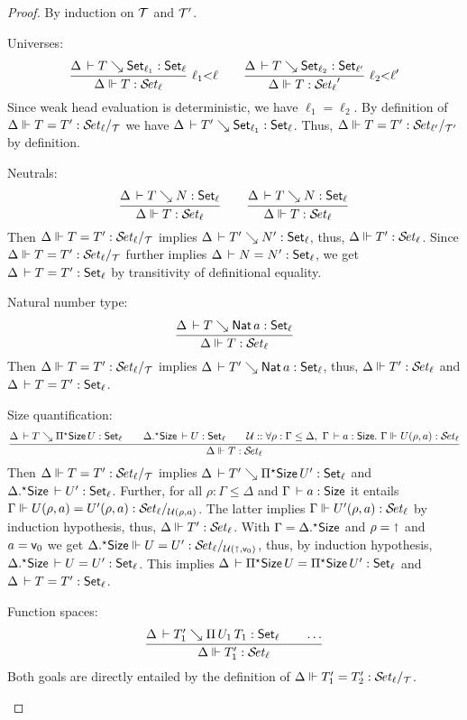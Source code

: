 \documentclass[acmlarge,review,anonymous]{acmart}\settopmatter{printfolios=true}
\begin{document}
\begin{proof}
  By induction on $\T$ and $\T'$.  %
\begin{caselist}

\nextcase Universes:
\[
  \rux{\Delta \der T \evalsto \Set[\ell_1] : \Set[\ell]
     }{\sty \Delta T \ell
     }{\ell_1 {<} \ell}
\qquad
  \rux{\Delta \der T \evalsto \Set[\ell_2] : \Set[\ell']
     }{\sty \Delta T \ell'
     }{\ell_2 {<} \ell'}
\]
Since weak head evaluation is deterministic, we have $\ell_1 = \ell_2$.
By definition of $\steqd \Delta T {T'} \ell {\T}$ we have
$\Delta \der T' \evalsto \Set[\ell_1] : \Set[\ell]$.
Thus, $\steqd \Delta T {T'} {\ell'} {\T'}$ by definition.

\nextcase Neutrals:
\[
  \ru{\Delta \der T \evalsto N : \Set[\ell]
    }{\sty \Delta T \ell}
\qquad
  \ru{\Delta \der T \evalsto N : \Set[\ell]
    }{\sty \Delta T \ell}
\]
Then $\steqd \Delta T {T'} \ell {\T}$ implies $\Delta \der T' \evalsto N' : \Set[\ell]$, thus,
$\sty \Delta {T'} \ell$.
Since $\steqd \Delta T {T'} \ell {\T}$ further implies $\Delta \der N = N' : \Set[\ell]$, we get
$\Delta \der T = T' : \Set[\ell]$ by transitivity of definitional equality.

\nextcase Natural number type:
\[
  \ru{\Delta \der T \evalsto \Nat a : \Set[\ell]
    }{\sty \Delta T \ell}
\]
Then $\steqd \Delta T {T'} \ell {\T}$ implies $\Delta \der T' \evalsto \Nat a : \Set[\ell]$, thus,
$\sty \Delta {T'} \ell$ and $\Delta \der T = T' : \Set[\ell]$.


\nextcase Size quantification:
\[
  \rul{\Delta \der T \evalsto \epiT \Size U : \Set[\ell] \qquad
       \eext \Delta \Size \der U : \Set[\ell] \qquad
      \U :: \forall \rho : \Gamma \leq \Delta,~\Gamma \der a : \Size.~
        \sty \Gamma {U(\rho,a)} \ell \\
    }{\sty \Delta {T} \ell}
\]
Then $\steqd \Delta T {T'} \ell {\T}$ implies $\Delta \der T' \evalsto \epiT \Size {U'} : \Set[\ell]$
and $\eext \Delta \Size \der U' : \Set[\ell]$. Further,
for all $\rho : \Gamma \leq \Delta$ and $\Gamma \der a : \Size$
it entails $\steqd \Gamma {U(\rho,a)} {U'(\rho,a)} \ell {\U(\rho,a)}$.
The latter implies $\sty \Gamma {U'(\rho,a)} \ell$ by induction hypothesis, thus,
$\sty \Delta {T'} \ell$.
With $\Gamma = \eext \Delta \Size$ and $\rho = \slift$ and $a = \ind 0$ we get
$\steqd {\eext \Delta \Size} {U} {U'} {\ell} {\U(\slift,\ind 0)}$, thus, by induction hypothesis,
$\eext \Delta \Size \der U = U' : \Set[\ell]$. This implies
$\Delta \der \epiT \Size U = \epiT \Size U' : \Set[\ell]$
and $\Delta \der T = T' : \Set[\ell]$.

\nextcase Function spaces:
\[
  \rul{\Delta \der T_1' \evalsto \piT {U_1} {T_1} : \Set[\ell] \qquad \dots
    }{\sty \Delta {T_1'} \ell}
\]
Both goals are directly entailed by the definition of $\steqd \Delta {T_1'} {T_2'} \ell {\T}$.

\end{caselist}
\end{proof}
\end{document}
